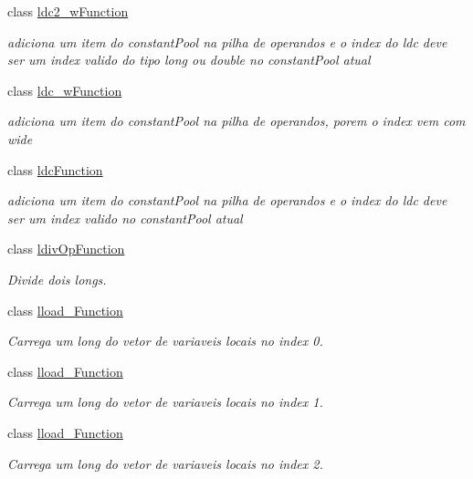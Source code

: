 \begin{DoxyCompactItemize}
class \hyperlink{classInstruction_1_1ldc2__wFunction}{ldc2\+\_\+w\+Function}
\begin{DoxyCompactList}\small\item\em adiciona um item do constant\+Pool na pilha de operandos e o index do ldc deve ser um index valido do tipo long ou double no constant\+Pool atual \end{DoxyCompactList}\item 
class \hyperlink{classInstruction_1_1ldc__wFunction}{ldc\+\_\+w\+Function}
\begin{DoxyCompactList}\small\item\em adiciona um item do constant\+Pool na pilha de operandos, porem o index vem com wide \end{DoxyCompactList}\item 
class \hyperlink{classInstruction_1_1ldcFunction}{ldc\+Function}
\begin{DoxyCompactList}\small\item\em adiciona um item do constant\+Pool na pilha de operandos e o index do ldc deve ser um index valido no constant\+Pool atual \end{DoxyCompactList}\item 
class \hyperlink{classInstruction_1_1ldivOpFunction}{ldiv\+Op\+Function}
\begin{DoxyCompactList}\small\item\em Divide dois longs. \end{DoxyCompactList}\item 
class \hyperlink{classInstruction_1_1lload__0Function}{lload\+\_\+Function}
\begin{DoxyCompactList}\small\item\em Carrega um long do vetor de variaveis locais no index 0. \end{DoxyCompactList}\item 
class \hyperlink{classInstruction_1_1lload__1Function}{lload\+\_\+Function}
\begin{DoxyCompactList}\small\item\em Carrega um long do vetor de variaveis locais no index 1. \end{DoxyCompactList}\item 
class \hyperlink{classInstruction_1_1lload__2Function}{lload\+\_\+Function}
\begin{DoxyCompactList}\small\item\em Carrega um long do vetor de variaveis locais no index 2. \end{DoxyCompactList}\item 

\end{DoxyCompactItemize}
